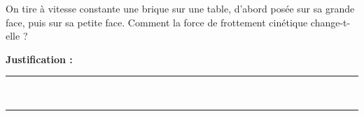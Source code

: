 On tire à vitesse constante une brique sur une table, d'abord posée sur sa grande face, puis sur sa petite face. Comment la force de frottement cinétique change-t-elle ?

\choices

\noindent\textbf{Justification :} \hrulefill \\[2.5ex]
\rule{\linewidth}{0.4pt} \\[2.5ex]
\rule{\linewidth}{0.4pt}
\vfill
